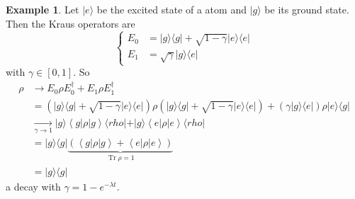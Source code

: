 \documentclass[12pt]{book}
\theoremstyle{definition}
\newtheorem*{example}{\bfseries Example}
\newcommand{\scalar}[1]{\left\langle {#1}\right\rangle}
\let\shortto\to
\renewcommand{\to}{\longrightarrow}
\newcommand{\para}[1]{\left( {#1} \right)}
\newcommand{\bra}[1]{\langle {#1} \vert}
\newcommand{\ket}[1]{\vert {#1} \rangle}
\DeclareMathOperator{\tr}{Tr}
\begin{document}
\begin{example}
Let $\ket{e}$ be the excited state of a atom and $\ket{g}$ be its ground state. Then the Kraus operators are
\begin{equation*}
  \begin{cases}
    E_0 & = \ket{g}\bra{g} + \sqrt{1 - \gamma} \ket{e} \bra{e} \\
    E_1 & = \sqrt{\gamma} \ket{g}\bra{e}
  \end{cases}
\end{equation*}
with $\gamma \in [0, 1]$. So
\begin{align*}
  \rho & \to E_0 \rho E_0^\dagger + E_1 \rho E_1^\dagger \\
  & = \para{\ket{g} \bra{g} + \sqrt{1 - \gamma} \ket{e} \bra{e}} \rho \para{\ket{g} \bra{g} + \sqrt{1 - \gamma} \ket{e} \bra{e}} +   \para{\gamma \ket{g}\bra{e}} \rho \ket{e}\bra{g} \\
  & \underset{\gamma \shortto 1}{\to} \ket{g}\scalar{g \vert \rho \vert g} \bra{rho} + \ket{g}\scalar{e \vert \rho \vert e} \bra{rho} \\
  & = \ket{g}\bra{g} \underbrace{\para{\scalar{g \vert \rho \vert g} + \scalar{e \vert \rho \vert e}}}_{\tr \rho = 1} \\
  & = \ket{g}\bra{g}
\end{align*}
a decay with $\gamma = 1 - e^{-\lambda t}$.
\end{example}
\end{document}
